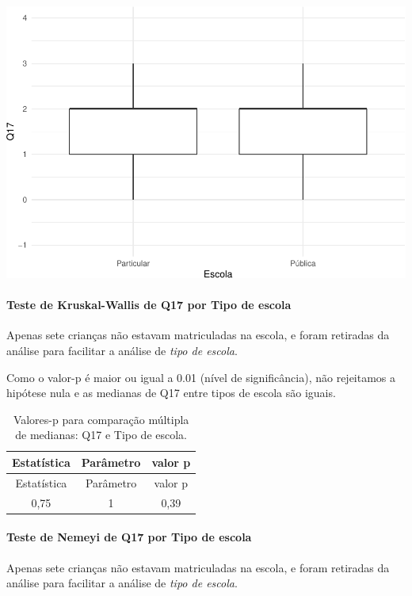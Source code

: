 \documentclass[]{article}
\let\oldparagraph\paragraph
\renewcommand{\paragraph}[1]{\oldparagraph{#1}\mbox{}}
\begin{document}
\begin{center}\includegraphics[width=0.75\linewidth]{relatorio_covid19_files/figure-latex/unnamed-chunk-235-1} \end{center}

\hypertarget{teste-de-kruskal-wallis-de-q17-por-tipo-de-escola}{%
\paragraph{Teste de Kruskal-Wallis de Q17 por Tipo de escola}\label{teste-de-kruskal-wallis-de-q17-por-tipo-de-escola}}

Apenas sete crianças não estavam matriculadas na escola, e foram retiradas da análise para facilitar a análise de \emph{tipo de escola}.

Como o valor-p é maior ou igual a 0.01 (nível de significância), não rejeitamos a hipótese nula e as medianas de Q17 entre tipos de escola são iguais.

\begin{longtable}[]{@{}ccc@{}}
\caption{\label{tab:unnamed-chunk-237}Valores-p para comparação múltipla de medianas: Q17 e Tipo de escola.}\tabularnewline
\toprule
Estatística & Parâmetro & valor p\tabularnewline
\midrule
\endfirsthead
\toprule
Estatística & Parâmetro & valor p\tabularnewline
\midrule
\endhead
0,75 & 1 & 0,39\tabularnewline
\bottomrule
\end{longtable}

\hypertarget{teste-de-nemeyi-de-q17-por-tipo-de-escola}{%
\paragraph{Teste de Nemeyi de Q17 por Tipo de escola}\label{teste-de-nemeyi-de-q17-por-tipo-de-escola}}

Apenas sete crianças não estavam matriculadas na escola, e foram retiradas da análise para facilitar a análise de \emph{tipo de escola}.
\end{document}
